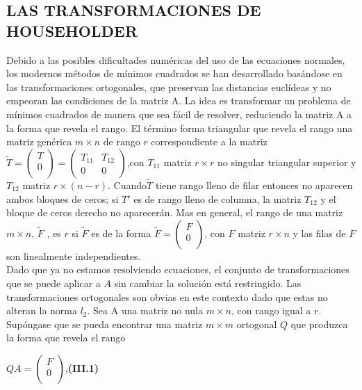 \documentclass[twocolumn,twoside]{article}
\begin{document}
\subsection{LAS TRANSFORMACIONES DE HOUSEHOLDER}
Debido a las posibles dificultades num\'ericas del uso de las ecuaciones normales, los
modernos m\'etodos de m\'inimos cuadrados se han desarrollado bas\'andose en las transformaciones 
ortogonales, que preservan las distancias eucl\'ideas y no empeoran las
condiciones de la matriz A. La idea es transformar un problema de m\'inimos cuadrados
de manera que sea f\'acil de resolver, reduciendo la matriz A a la forma que revela el rango.
El t\'ermino forma triangular que revela el rango una matriz gen\'erica $m\times n$ de rango $r$
correspondiente a la matriz $ \tilde T = 
\left(\begin{array}{c}
  T\\ 
  0\\
 \end{array}\right)=
 \left(\begin{array}{cc}
  T_{11} & T_{12} \\ 
  0     &   0
 \end{array}\right)
$,con $T_{11}$ matriz $r\times r$ no singular triangular superior y $T_{12}$ matriz $r\times (n-r)$.
Cuando$ \tilde T $ tiene rango lleno de filar entonces no aparecen ambos bloques de ceros; si $T'$ 
es de rango lleno de columna, la matriz $T_{12}$ y el bloque de ceros derecho no aparecer\'an. 
Mas en general, el rango de una 
matriz $m\times n$, $\tilde F$ , es $r$ si $\tilde F$ es de la forma $\tilde F =
\left(\begin{array}{c}
  F\\ 
  0\\
 \end{array}\right)$, con $F$ matriz $r\times n$ y las filas de $F$ son linealmente independientes.\\
Dado que ya no estamos resolviendo ecuaciones, el conjunto de transformaciones
que se puede aplicar a $A$ sin cambiar la soluci\'on est\'a restringido. Las transformaciones
ortogonales son obvias en este contexto dado que estas no alteran la norma $l_{2}$.
Sea A una matriz no nula $m\times n$, con rango igual a $r$. Sup\'ongase que se pueda
encontrar una matriz $m\times m$ ortogonal $Q$ que produzca la forma que revela el rango
\begin{center}
  $Q A =\left(\begin{array}{c}
    F\\ 
    0\\
   \end{array}\right)$,\hspace{2cm}\textbf{(III.1)}
\end{center}
\end{document}
